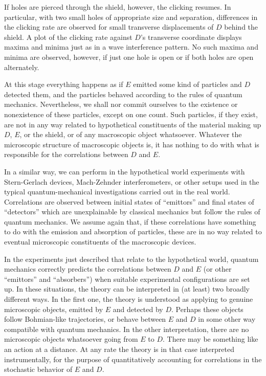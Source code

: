 \documentclass[12pt]{article}
\begin{document}
If holes are pierced through the shield, however,
the clicking resumes.  In particular, with
two small holes of appropriate size and
separation, differences in the clicking rate
are observed for small transverse displacements
of $D$ behind the shield.  A
plot of the clicking rate against $D$'s
transverse coordinate displays maxima and
minima just as in a wave interference pattern.
No such maxima and minima are observed, however,
if just one hole is open or if both holes
are open alternately.

At this stage everything happens as if $E$
emitted some kind of particles and $D$
detected them, and the particles behaved
according to the rules of quantum mechanics.
Nevertheless, we shall nor commit ourselves
to the existence or nonexistence of these
particles, except on one count.  Such particles,
if they exist, are not in any way related to
hypothetical constituents of the material
making up $D$, $E$, or the shield, or of any
macroscopic object whatsoever.  Whatever
the microscopic structure of macroscopic
objects is, it has nothing to do with what is
responsible for the correlations between
$D$ and $E$.

In a similar way, we can perform in the
hypothetical world experiments with Stern-Gerlach
devices, Mach-Zehnder interferometers, or other
setups used in the typical quantum-mechanical
investigations carried out in the real world.
Correlations are observed between initial states
of ``emittors'' and final states of ``detectors''
which are unexplainable by classical mechanics
but follow the rules of quantum mechanics.  We
assume again that, if these correlations have
something to do with the emission and absorption
of particles, these are in no way related
to eventual microscopic constituents of the
macroscopic devices.

In the experiments just described that relate to
the hypothetical world, quantum mechanics correctly
predicts the correlations between $D$ and $E$
(or other ``emittors'' and ``absorbers'') when suitable
experimental configurations are set up.  In these situations,
the theory can be interpreted in (at least) two
broadly different ways.  In the first one,
the theory is understood as applying to
genuine microscopic objects, emitted by $E$
and detected by $D$.  Perhaps these objects
follow Bohmian-like trajectories, or behave
between $E$ and $D$ in some other
way compatible with quantum mechanics.  In the
other interpretation, there are no microscopic
objects whatsoever going from $E$ to $D$.
There may be something like an action at a distance.
At any rate the theory is in that case
interpreted instrumentally,
for the purpose of quantitatively
accounting for correlations in the stochastic
behavior of $E$ and $D$.
\end{document}
